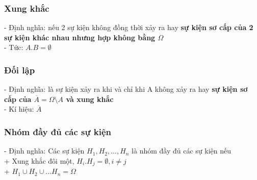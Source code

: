 \documentclass{article}
\begin{document}
\subsubsection[short]{Xung khắc}
- Định nghĩa: nếu 2 sự kiện không đồng thời xảy ra hay \textbf{sự kiện sơ cấp của 2 sự kiện khác nhau nhưng hợp không bằng $\Omega$}\\
- Tức: $A.B=\emptyset$\\

\subsubsection{Đối lập}
- Định nghĩa: là sự kiện xảy ra khi và chỉ khi A không xảy ra hay \textbf{sự kiện sơ cấp của $\overline{A}= \Omega \setminus A$ và xung khắc}\\
- Kí hiệu: $\overline{A}$\\

\subsubsection{Nhóm đầy đủ các sự kiện}
- Định nghĩa: Các sự kiện $H_1, H_2, ..., H_n$ là nhóm đầy đủ các sự kiện nếu\\
+ Xung khắc đôi một, $H_i.H_j=\emptyset, i \neq j$\\
+ $H_1 \cup H_2 \cup ... H_n= \Omega$\\
\end{document}
